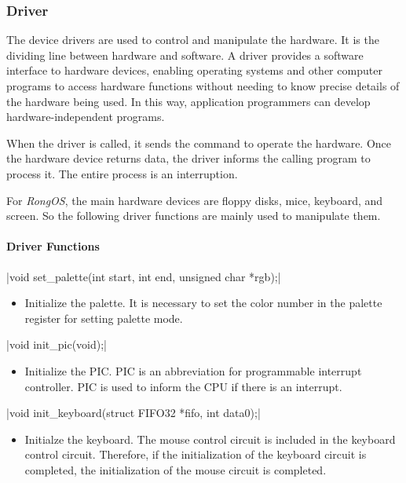 \documentclass{swfcthesis}
\begin{document}
\subsubsection{Driver}
\label{sec:driver}

The device drivers are used to control and manipulate the hardware. It is the dividing
line between hardware and software. A driver provides a software interface to hardware
devices, enabling operating systems and other computer programs to access hardware
functions without needing to know precise details of the hardware being used. In this way,
application programmers can develop hardware-independent programs.

When the driver is called, it sends the command to operate the hardware. Once the hardware
device returns data, the driver informs the calling program to process it. The entire
process is an interruption.

For \emph{RongOS}, the main hardware devices are floppy disks, mice, keyboard, and
screen. So the following driver functions are mainly used to manipulate them.

\paragraph{Driver Functions}

\csingle|void set_palette(int start, int end, unsigned char *rgb);|
\begin{itemize}
\item Initialize the palette. It is necessary to set the color number in the palette
  register for setting palette mode. 
\end{itemize}

\csingle|void init_pic(void);|
\begin{itemize}
\item Initialize the PIC. PIC is an abbreviation for programmable interrupt
  controller. PIC is used to inform the CPU if there is an interrupt. 
  
  
\end{itemize}

\csingle|void init_keyboard(struct FIFO32 *fifo, int data0);|
\begin{itemize}
\item Initialze the keyboard. The mouse control circuit is included in the keyboard
  control circuit. Therefore, if the initialization of the keyboard circuit is completed,
  the initialization of the mouse circuit is completed.
  
\end{itemize}
\end{document}

